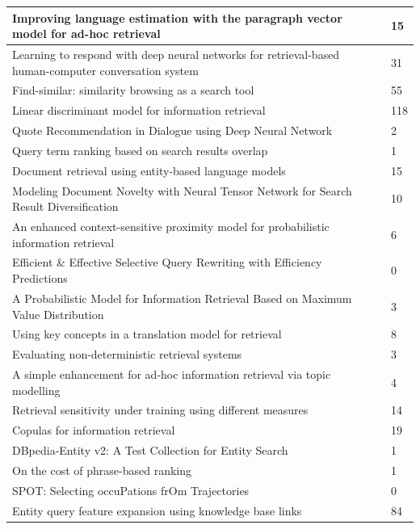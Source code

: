 \documentclass[letterpaper,11pt]{article}
\newcommand*{\srcPath}{../src}%
\begin{document}
\begin{center}
\begin{longtable}{|*2{p{3.5cm}| }}
Improving language estimation with the paragraph vector model for ad-hoc retrieval & 15 \\ \hline
Learning to respond with deep neural networks for retrieval-based human-computer conversation system & 31 \\ \hline
Find-similar: similarity browsing as a search tool & 55 \\ \hline
Linear discriminant model for information retrieval & 118 \\ \hline
Quote Recommendation in Dialogue using Deep Neural Network & 2 \\ \hline
Query term ranking based on search results overlap & 1 \\ \hline
Document retrieval using entity-based language models & 15 \\ \hline
Modeling Document Novelty with Neural Tensor Network for Search Result Diversification & 10 \\ \hline
An enhanced context-sensitive proximity model for probabilistic information retrieval & 6 \\ \hline
Efficient \& Effective Selective Query Rewriting with Efficiency Predictions & 0 \\ \hline
A Probabilistic Model for Information Retrieval Based on Maximum Value Distribution & 3 \\ \hline
Using key concepts in a translation model for retrieval & 8 \\ \hline
Evaluating non-deterministic retrieval systems & 3 \\ \hline
A simple enhancement for ad-hoc information retrieval via topic modelling & 4 \\ \hline
Retrieval sensitivity under training using different measures & 14 \\ \hline
Copulas for information retrieval & 19 \\ \hline
DBpedia-Entity v2: A Test Collection for Entity Search & 1 \\ \hline
On the cost of phrase-based ranking & 1 \\ \hline
SPOT: Selecting occuPations frOm Trajectories & 0 \\ \hline
Entity query feature expansion using knowledge base links & 84 \\ \hline
\end{longtable}
\end{center}

 
\end{document}
